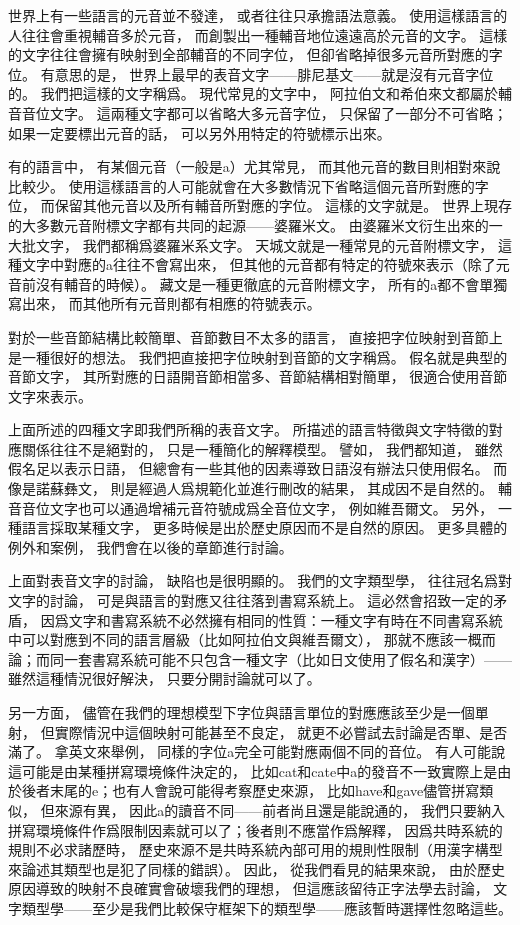 世界上有一些語言的元音並不發達，
或者往往只承擔語法意義。
使用這樣語言的人往往會重視輔音多於元音，
而創製出一種輔音地位遠遠高於元音的文字。
這樣的文字往往會擁有映射到全部輔音的不同字位，
但卻省略掉很多元音所對應的字位。
有意思的是，
世界上最早的表音文字——腓尼基文——就是沒有元音字位的。
我們把這樣的文字稱爲。
現代常見的文字中，
阿拉伯文和希伯來文都屬於輔音音位文字。
這兩種文字都可以省略大多元音字位，
只保留了一部分不可省略；如果一定要標出元音的話，
可以另外用特定的符號標示出來。

有的語言中，
有某個元音（一般是a）尤其常見，
而其他元音的數目則相對來說比較少。
使用這樣語言的人可能就會在大多數情況下省略這個元音所對應的字位，
而保留其他元音以及所有輔音所對應的字位。
這樣的文字就是。
世界上現存的大多數元音附標文字都有共同的起源——婆羅米文。
由婆羅米文衍生出來的一大批文字，
我們都稱爲婆羅米系文字。
天城文就是一種常見的元音附標文字，
這種文字中對應的a往往不會寫出來，
但其他的元音都有特定的符號來表示（除了元音前沒有輔音的時候）。
藏文是一種更徹底的元音附標文字，
所有的a都不會單獨寫出來，
而其他所有元音則都有相應的符號表示。

對於一些音節結構比較簡單、音節數目不太多的語言，
直接把字位映射到音節上是一種很好的想法。
我們把直接把字位映射到音節的文字稱爲。
假名就是典型的音節文字，
其所對應的日語開音節相當多、音節結構相對簡單，
很適合使用音節文字來表示。

上面所述的四種文字即我們所稱的表音文字。
所描述的語言特徵與文字特徵的對應關係往往不是絕對的，
只是一種簡化的解釋模型。
譬如，
我們都知道，
雖然假名足以表示日語，
但總會有一些其他的因素導致日語沒有辦法只使用假名。
而像是諾蘇彝文，
則是經過人爲規範化並進行刪改的結果，
其成因不是自然的。
輔音音位文字也可以通過增補元音符號成爲全音位文字，
例如維吾爾文。
另外，
一種語言採取某種文字，
更多時候是出於歷史原因而不是自然的原因。
更多具體的例外和案例，
我們會在以後的章節進行討論。

上面對表音文字的討論，
缺陷也是很明顯的。
我們的文字類型學，
往往冠名爲對文字的討論，
可是與語言的對應又往往落到書寫系統上。
這必然會招致一定的矛盾，
因爲文字和書寫系統不必然擁有相同的性質：一種文字有時在不同書寫系統中可以對應到不同的語言層級（比如阿拉伯文與維吾爾文），
那就不應該一概而論；而同一套書寫系統可能不只包含一種文字（比如日文使用了假名和漢字）——雖然這種情況很好解決，
只要分開討論就可以了。

另一方面，
儘管在我們的理想模型下字位與語言單位的對應應該至少是一個單射，
但實際情況中這個映射可能甚至不良定，
就更不必嘗試去討論是否單、是否滿了。
拿英文來舉例，
同樣的字位a完全可能對應兩個不同的音位。
有人可能說這可能是由某種拼寫環境條件決定的，
比如cat和cate中a的發音不一致實際上是由於後者末尾的e；也有人會說可能得考察歷史來源，
比如have和gave儘管拼寫類似，
但來源有異，
因此a的讀音不同——前者尚且還是能說通的，
我們只要納入拼寫環境條件作爲限制因素就可以了；後者則不應當作爲解釋，
因爲共時系統的規則不必求諸歷時，
歷史來源不是共時系統內部可用的規則性限制（用漢字構型來論述其類型也是犯了同樣的錯誤）。
因此，
從我們看見的結果來說，
由於歷史原因導致的映射不良確實會破壞我們的理想，
但這應該留待正字法學去討論，
文字類型學——至少是我們比較保守框架下的類型學——應該暫時選擇性忽略這些。

